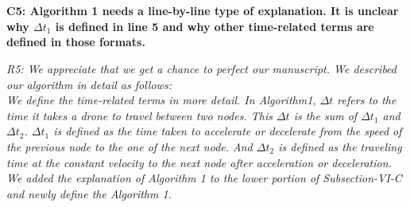 \documentclass[onecolumn]{IEEEconf}
\let\oldnl\nl%
\newcommand{\nonl}{\renewcommand{\nl}{\let\nl\oldnl}}
\begin{document}
\begin{description}
    \SetNlSty{}{\color{black}}{:}
    \SetAlFnt{\color{black}}
    ~\\
    ~\\
    \item \textbf
    {
	C5: Algorithm 1 needs a line-by-line type of explanation. It is unclear why $\Delta t_1$ is defined in line 5 and why other time-related terms are defined in those formats.
	}
	\item \textit
	{
    R5: We appreciate that we get a chance to perfect our manuscript. We described our algorithm in detail as follows:\\
    We define the time-related terms in more detail. In Algorithm1, $\Delta t$ refers to the time it takes a drone to travel between two nodes. This $\Delta t$ is the sum of $\Delta t_1$ and $\Delta t_2$. $\Delta t_1$ is defined as the time taken to accelerate or decelerate from the speed of the previous node to the one of the next node. And $\Delta t_2$ is defined as the traveling time at the constant velocity to the next node after acceleration or deceleration. We added the explanation of Algorithm 1 to the lower portion of Subsection-VI-C and newly define the Algorithm 1.
}
\end{description}
\end{document}
